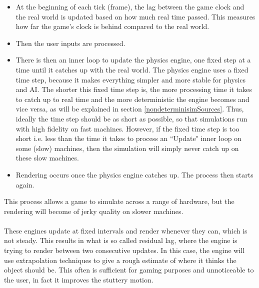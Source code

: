 \begin{itemize}[leftmargin=*]
    \item At the beginning of each tick (frame), the lag between the game clock and the real world is updated based on how much real time passed. This measures how far the game's clock is behind compared to the real world.
    \item Then the user inputs are processed.
    \item There is then an inner loop to update the physics engine, one fixed step at a time until it catches up with the real world. 
    The physics engine uses a fixed time step, because it makes everything simpler and more stable for physics and AI. 
    The shorter this fixed time step is, the more processing time it takes to catch up to real time and the more deterministic the engine becomes and vice versa\cite{GameEngineArchBook}\cite{GameProgPatternsBook}, as will be explained in section \ref{nondeterminisimSources}. 
    Thus, ideally the time step should be as short as possible, so that simulations run with high fidelity on fast machines. 
    However, if the fixed time step is too short i.e. less than the time it takes to process an ``Update" inner loop on some (slow) machines, then the simulation will simply never catch up on these slow machines.
    \item Rendering occurs once the physics engine catches up. The process then starts again.
\end{itemize} 

\noindent This process allows a game to simulate across a range of hardware, but the rendering will become of jerky quality on slower machines. \\\\
These engines update at fixed intervals and render whenever they can, which is not steady. 
This results in what is so called residual lag\cite{GameEngineArchBook}\cite{GameProgPatternsBook}, where the engine is trying to render between two consecutive updates. 
In this case, the engine will use extrapolation techniques to give a rough estimate of where it thinks the object should be. 
This often is sufficient for gaming purposes and unnoticeable to the user, in fact it improves the stuttery motion.
